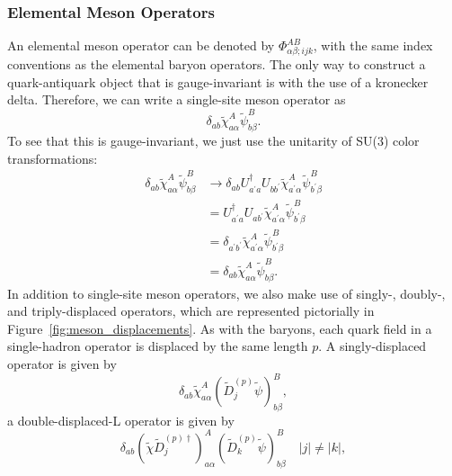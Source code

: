     \subsubsection{Elemental Meson Operators}
    An elemental meson operator can be denoted by $\Phi^{AB}_{\alpha \beta; ijk}$, with the same index conventions as the elemental baryon operators. The only way to construct a quark-antiquark object that is gauge-invariant is with the use of a kronecker delta. Therefore, we can write a single-site meson operator as
    \begin{equation}
        \delta_{a b} \widetilde{\chi}_{a \alpha}^{A} \widetilde{\psi}_{b \beta}^{B}.
    \end{equation}
    To see that this is gauge-invariant, we just use the unitarity of SU(3) color transformations:
    \begin{equation}
        \begin{aligned}
            \delta_{a b} \widetilde{\chi}_{a \alpha}^{A} \widetilde{\psi}_{b \beta}^{B} &\rightarrow
            \delta_{a b} U^\dagger_{a^\prime a} U_{b b^\prime} \widetilde{\chi}_{a^\prime \alpha}^{A} \widetilde{\psi}_{b^\prime \beta}^{B} \\
            & = U^\dagger_{a^\prime a} U_{a b^\prime} \widetilde{\chi}_{a^\prime \alpha}^{A} \widetilde{\psi}_{b^\prime \beta}^{B} \\
            & = \delta_{a^\prime b^\prime} \widetilde{\chi}_{a^\prime \alpha}^{A} \widetilde{\psi}_{b^\prime \beta}^{B} \\
            & = \delta_{a b} \widetilde{\chi}_{a \alpha}^{A} \widetilde{\psi}_{b \beta}^{B}.
        \end{aligned}
    \end{equation}
    In addition to single-site meson operators, we also make use of singly-, doubly-, and triply-displaced operators, which are represented pictorially in Figure~\ref{fig:meson_displacements}. As with the baryons, each quark field in a single-hadron operator is displaced by the same length $p$. A singly-displaced operator is given by
    \begin{equation}
        \delta_{a b} \widetilde{\chi}_{a \alpha}^{A}\left(\widetilde{D}_{j}^{(p)} \widetilde{\psi}\right)_{b \beta}^{B},
    \end{equation}
    a double-displaced-L operator is given by
    \begin{equation}
        \delta_{a b}\left(\widetilde{\chi} \widetilde{D}_{j}^{(p) \dagger}\right)_{a \alpha}^{A}\left(\widetilde{D}_{k}^{(p)} \widetilde{\psi}\right)_{b \beta}^{B} \quad|j| \neq|k|,
    \end{equation}
